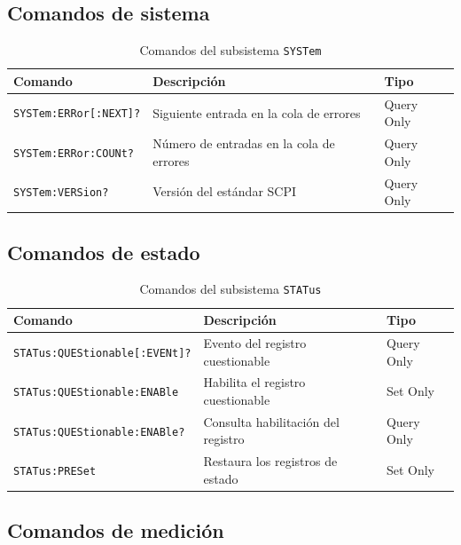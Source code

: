 \subsection*{Comandos de sistema}

\begin{table}[H]

    \caption{Comandos del subsistema \texttt{SYSTem}}
    \label{tab:syst-group}
    \begin{tabular}{lll}
        \toprule
        \textbf{Comando} & \textbf{Descripción} & \textbf{Tipo} \\
        \midrule
        \texttt{SYSTem:ERRor[:NEXT]?}   & Siguiente entrada en la cola de errores & Query Only \\
        \texttt{SYSTem:ERRor:COUNt?}    & Número de entradas en la cola de errores& Query Only \\
        \texttt{SYSTem:VERSion?}        & Versión del estándar SCPI               & Query Only \\
        \bottomrule
    \end{tabular}
\end{table}

\subsection*{Comandos de estado}

\begin{table}[H]

    \caption{Comandos del subsistema \texttt{STATus}}
    \label{tab:stat-group}
    \begin{tabular}{lll}
        \toprule
        \textbf{Comando} & \textbf{Descripción} & \textbf{Tipo} \\
        \midrule
        \texttt{STATus:QUEStionable[:EVENt]?} & Evento del registro cuestionable    & Query Only \\
        \texttt{STATus:QUEStionable:ENABle}   & Habilita el registro cuestionable   & Set Only \\
        \texttt{STATus:QUEStionable:ENABle?}  & Consulta habilitación del registro  & Query Only \\
        \texttt{STATus:PRESet}                & Restaura los registros de estado    & Set Only \\
        \bottomrule
    \end{tabular}
\end{table}

\subsection*{Comandos de medición}

